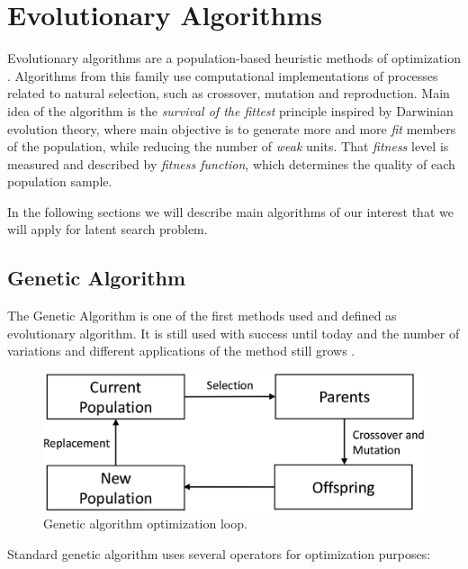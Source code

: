 \documentclass[12pt,a4paper,openany]{book}
\begin{document}
\newpage
\section{Evolutionary Algorithms}

\noindent Evolutionary algorithms are a population-based heuristic methods of optimization \cite{de}. Algorithms from this family use computational implementations of processes related to natural selection, such as crossover, mutation and reproduction. Main idea of the algorithm is the \textit{survival of the fittest} principle inspired by Darwinian evolution theory, where main objective is to generate more and more \textit{fit} members of the population, while reducing the number of \textit{weak} units. That \textit{fitness} level is measured and described by \textit{fitness function}, which determines the quality of each population sample.

\noindent In the following sections we will describe main algorithms of our interest that we will apply for latent search problem. 
\subsection{Genetic Algorithm}


\noindent The Genetic Algorithm is one of the first methods used and defined as evolutionary algorithm. It is still used with success until today and the number of variations and different applications of the method still grows \cite{ea}.

 \begin{figure}[ht!]
     \centering
     \includegraphics[scale=0.22]{figs/gen-algo.eps}
     \caption{Genetic algorithm optimization loop.}\label{Fig:genalgo1}
 \end{figure}


\noindent Standard genetic algorithm uses several operators for optimization purposes:
\end{document}
